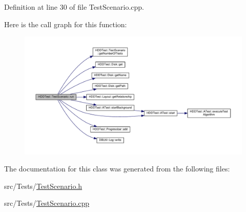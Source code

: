 Definition at line 30 of file Test\-Scenario.\-cpp.



Here is the call graph for this function\-:
\nopagebreak
\begin{figure}[H]
\begin{center}
\leavevmode
\includegraphics[width=350pt]{class_h_d_d_test_1_1_test_scenario_a33ace13f97b5c5ded8da22ca55416c5a_cgraph}
\end{center}
\end{figure}




The documentation for this class was generated from the following files\-:\begin{DoxyCompactItemize}
\item 
src/\-Tests/\hyperlink{_test_scenario_8h}{Test\-Scenario.\-h}\item 
src/\-Tests/\hyperlink{_test_scenario_8cpp}{Test\-Scenario.\-cpp}\end{DoxyCompactItemize}
